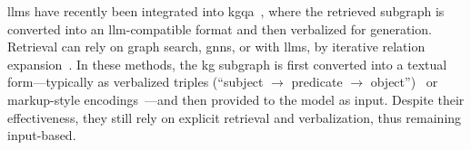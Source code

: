 

\Acp{llm} have recently been integrated into \ac{kgqa}~\cite{peng2024graphretrievalaugmentedgenerationsurvey}, where the retrieved subgraph is converted into an \ac{llm}-compatible format and then verbalized for generation. Retrieval can rely on graph search, \acp{gnn}, or with \acp{llm}, \eg by iterative relation expansion~\cite{zhang-etal-2022-subgraph,kim-etal-2023-kg}. In these methods, the \ac{kg} subgraph is first converted into a textual form---typically as verbalized triples (\eg ``subject $\to$ predicate $\to$ object'')~\cite{mavromatis-karypis-2025-gnn} or markup-style encodings~\cite{peng2024graphretrievalaugmentedgenerationsurvey}---and then provided to the model as input. Despite their effectiveness, they still rely on explicit retrieval and verbalization, thus remaining input-based.






